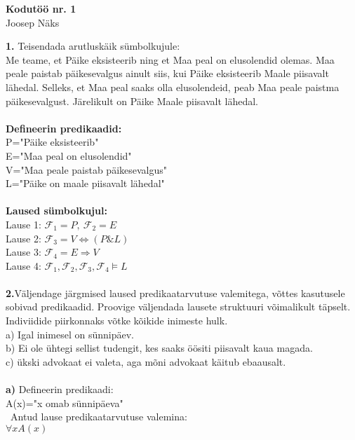 \documentclass{article}
\begin{document}
\begin{center}
\Large\textbf{Kodut\"o\"o nr. 1}\\
Joosep N\"aks
\end{center}
\textbf{1.} Teisendada arutlusk\"aik s\"umbolkujule:\\
Me teame, et P\"aike eksisteerib ning et Maa peal on elusolendid olemas. Maa peale paistab p\"aikesevalgus ainult siis, kui P\"aike eksisteerib Maale piisavalt l\"ahedal. Selleks, et Maa peal saaks olla elusolendeid, peab Maa peale paistma p\"aikesevalgust. J\"arelikult on P\"aike Maale piisavalt l\"ahedal.\\\\
\textbf{Defineerin predikaadid:}\\
P="P\"aike eksisteerib"\\
E="Maa peal on elusolendid"\\
V="Maa peale paistab p\"aikesevalgus"\\
L="P\"aike on maale piisavalt l\"ahedal"\\\\
\textbf{Laused s\"umbolkujul:}\\
Lause 1: $\mathcal{F}_1 = P,\ \mathcal{F}_2 = E$\\
Lause 2: $\mathcal{F}_3 = V\Leftrightarrow (P\&L)$\\
Lause 3: $\mathcal{F}_4 = E\Rightarrow V$\\
Lause 4: $\mathcal{F}_1,\mathcal{F}_2, \mathcal{F}_3, \mathcal{F}_4 \models L$\\\\
\textbf{2.}V\"aljendage j\"argmised laused predikaatarvutuse valemitega, v\~ottes kasutusele sobivad predikaadid. Proovige v\"aljendada lausete struktuuri v\~oimalikult t\"apselt. Indiviidide piirkonnaks v\~otke k\~oikide inimeste hulk.\\
\null\quad a) Igal inimesel on s\"unnip\"aev.\\
\null\quad b) Ei ole \"uhtegi sellist tudengit, kes saaks \"o\"ositi piisavalt kaua magada.\\
\null\quad c) \"ukski advokaat ei valeta, aga m\~oni advokaat k\"aitub ebaausalt.\\\\
\textbf{a)} Defineerin predikaadi:\\
\null\quad\quad A(x)="x omab s\"unnip\"aeva"\\
\null\quad\ Antud lause predikaatarvutuse valemina:\\
\null\quad\quad $\forall xA(x)$\\
\end{document}
